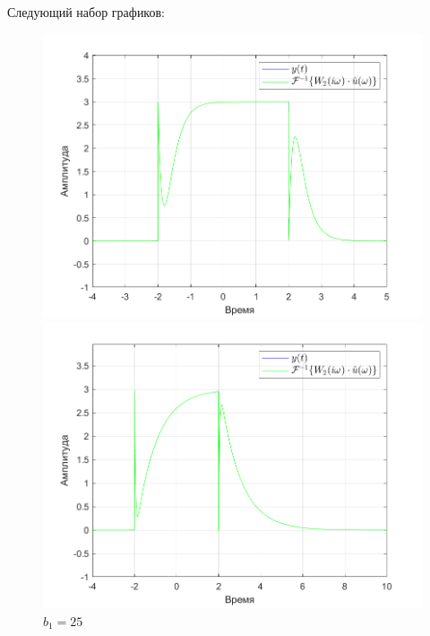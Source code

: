 \documentclass[a4paper]{article}
\begin{document}
Следующий набор графиков:

\begin{figure}[H]
    \begin{minipage}{0.5\textwidth}
        \centering
        \includegraphics[width=\linewidth]{ex1_2/a1=0_a2=25_b1=10.5_b2=25_d=5/h3.png}
        \caption{$b_1=10.5$}
    \end{minipage}
    \begin{minipage}{0.5\textwidth}
        \centering
        \includegraphics[width=\linewidth]{ex1_2/a1=0_a2=25_b1=25_b2=25_d=5/h3.png}
        \caption{$b_1=25$}
    \end{minipage}
\end{figure}
\end{document}
